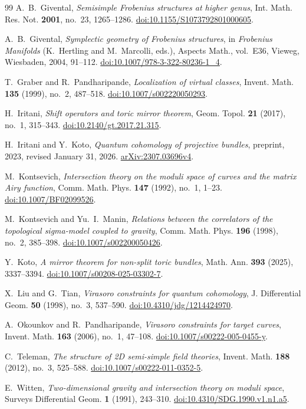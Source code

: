 \begin{thebibliography}{99}
A.~B.~Givental,
\emph{Semisimple Frobenius structures at higher genus},
Int. Math. Res. Not. \textbf{2001}, no.~23, 1265--1286.
\href{https://doi.org/10.1155/S1073792801000605}{doi:10.1155/S1073792801000605}.

A.~B.~Givental,
\emph{Symplectic geometry of Frobenius structures},
in \emph{Frobenius Manifolds} (K.~Hertling and M.~Marcolli, eds.),
Aspects Math., vol.~E36, Vieweg, Wiesbaden, 2004, 91--112.
\href{https://doi.org/10.1007/978-3-322-80236-1_4}{doi:10.1007/978-3-322-80236-1\_4}.

T.~Graber and R.~Pandharipande,
\emph{Localization of virtual classes},
Invent. Math. \textbf{135} (1999), no.~2, 487--518.
\href{https://doi.org/10.1007/s002220050293}{doi:10.1007/s002220050293}.

H.~Iritani,
\emph{Shift operators and toric mirror theorem},
Geom. Topol. \textbf{21} (2017), no.~1, 315--343.
\href{https://doi.org/10.2140/gt.2017.21.315}{doi:10.2140/gt.2017.21.315}.

H.~Iritani and Y.~Koto,
\emph{Quantum cohomology of projective bundles},
preprint, 2023, revised January 31, 2026.
\href{https://arxiv.org/abs/2307.03696v4}{arXiv:2307.03696v4}.

M.~Kontsevich,
\emph{Intersection theory on the moduli space of curves and the matrix
Airy function},
Comm. Math. Phys. \textbf{147} (1992), no.~1, 1--23.
\href{https://doi.org/10.1007/BF02099526}{doi:10.1007/BF02099526}.

M.~Kontsevich and Yu.~I.~Manin,
\emph{Relations between the correlators of the topological sigma-model
coupled to gravity},
Comm. Math. Phys. \textbf{196} (1998), no.~2, 385--398.
\href{https://doi.org/10.1007/s002200050426}{doi:10.1007/s002200050426}.

Y.~Koto,
\emph{A mirror theorem for non-split toric bundles},
Math. Ann. \textbf{393} (2025), 3337--3394.
\href{https://doi.org/10.1007/s00208-025-03302-7}{doi:10.1007/s00208-025-03302-7}.

X.~Liu and G.~Tian,
\emph{Virasoro constraints for quantum cohomology},
J. Differential Geom. \textbf{50} (1998), no.~3, 537--590.
\href{https://doi.org/10.4310/jdg/1214424970}{doi:10.4310/jdg/1214424970}.

A.~Okounkov and R.~Pandharipande,
\emph{Virasoro constraints for target curves},
Invent. Math. \textbf{163} (2006), no.~1, 47--108.
\href{https://doi.org/10.1007/s00222-005-0455-y}{doi:10.1007/s00222-005-0455-y}.

C.~Teleman,
\emph{The structure of 2D semi-simple field theories},
Invent. Math. \textbf{188} (2012), no.~3, 525--588.
\href{https://doi.org/10.1007/s00222-011-0352-5}{doi:10.1007/s00222-011-0352-5}.

E.~Witten,
\emph{Two-dimensional gravity and intersection theory on moduli space},
Surveys Differential Geom. \textbf{1} (1991), 243--310.
\href{https://doi.org/10.4310/SDG.1990.v1.n1.a5}{doi:10.4310/SDG.1990.v1.n1.a5}.

\end{thebibliography}
